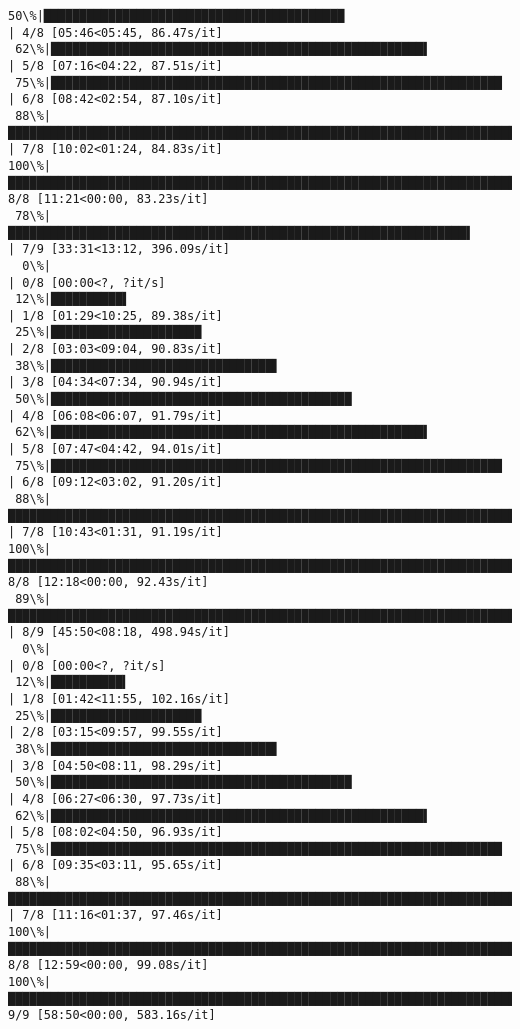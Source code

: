 \documentclass[11pt]{article}
\begin{document}
\begin{Verbatim}[commandchars=\\\{\}]
 50\%|██████████████████████████████████████████                                          | 4/8 [05:46<05:45, 86.47s/it]
 62\%|████████████████████████████████████████████████████▌                               | 5/8 [07:16<04:22, 87.51s/it]
 75\%|███████████████████████████████████████████████████████████████                     | 6/8 [08:42<02:54, 87.10s/it]
 88\%|█████████████████████████████████████████████████████████████████████████▌          | 7/8 [10:02<01:24, 84.83s/it]
100\%|████████████████████████████████████████████████████████████████████████████████████| 8/8 [11:21<00:00, 83.23s/it]
 78\%|████████████████████████████████████████████████████████████████▌                  | 7/9 [33:31<13:12, 396.09s/it]
  0\%|                                                                                            | 0/8 [00:00<?, ?it/s]
 12\%|██████████▌                                                                         | 1/8 [01:29<10:25, 89.38s/it]
 25\%|█████████████████████                                                               | 2/8 [03:03<09:04, 90.83s/it]
 38\%|███████████████████████████████▌                                                    | 3/8 [04:34<07:34, 90.94s/it]
 50\%|██████████████████████████████████████████                                          | 4/8 [06:08<06:07, 91.79s/it]
 62\%|████████████████████████████████████████████████████▌                               | 5/8 [07:47<04:42, 94.01s/it]
 75\%|███████████████████████████████████████████████████████████████                     | 6/8 [09:12<03:02, 91.20s/it]
 88\%|█████████████████████████████████████████████████████████████████████████▌          | 7/8 [10:43<01:31, 91.19s/it]
100\%|████████████████████████████████████████████████████████████████████████████████████| 8/8 [12:18<00:00, 92.43s/it]
 89\%|█████████████████████████████████████████████████████████████████████████▊         | 8/9 [45:50<08:18, 498.94s/it]
  0\%|                                                                                            | 0/8 [00:00<?, ?it/s]
 12\%|██████████▍                                                                        | 1/8 [01:42<11:55, 102.16s/it]
 25\%|█████████████████████                                                               | 2/8 [03:15<09:57, 99.55s/it]
 38\%|███████████████████████████████▌                                                    | 3/8 [04:50<08:11, 98.29s/it]
 50\%|██████████████████████████████████████████                                          | 4/8 [06:27<06:30, 97.73s/it]
 62\%|████████████████████████████████████████████████████▌                               | 5/8 [08:02<04:50, 96.93s/it]
 75\%|███████████████████████████████████████████████████████████████                     | 6/8 [09:35<03:11, 95.65s/it]
 88\%|█████████████████████████████████████████████████████████████████████████▌          | 7/8 [11:16<01:37, 97.46s/it]
100\%|████████████████████████████████████████████████████████████████████████████████████| 8/8 [12:59<00:00, 99.08s/it]
100\%|███████████████████████████████████████████████████████████████████████████████████| 9/9 [58:50<00:00, 583.16s/it]

    \end{Verbatim}
\end{document}
